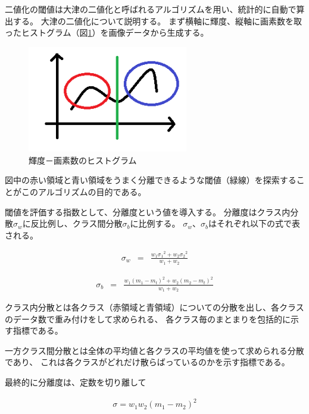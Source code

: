 \documentclass{jsarticle}
\begin{document}
\begin{multicols}{2}
二値化の閾値は大津の二値化と呼ばれるアルゴリズムを用い、統計的に自動で算出する。
大津の二値化について説明する。
まず横軸に輝度、縦軸に画素数を取ったヒストグラム（図\ref{fig:otsu}）を画像データから生成する。

\begin{figure}[H]
  \begin{center}
    \includegraphics[clip,width=7.0cm]{./img/otsu.png}
    \caption{輝度－画素数のヒストグラム}
    \label{fig:otsu}
  \end{center}
\end{figure}

図中の赤い領域と青い領域をうまく分離できるような閾値（緑線）を探索することがこのアルゴリズムの目的である。

閾値を評価する指数として、分離度という値を導入する。
分離度はクラス内分散$σ_{w}$に反比例し、クラス間分散$σ_{b}$に比例する。
$σ_{w}$、$σ_{b}$はそれぞれ以下の式で表される。

\begin{eqnarray}
\label{sigmaw}
{ \sigma  }_{ w } & = & \frac { { w }_{ 1 }{{ \sigma  }_{ 1 }}^{2}+{ w }_{ 2 }{{ \sigma  }_{ 2 } }^{2}}{ { w }_{ 1 }+{ w }_{ 2 } } 
\end{eqnarray}

\begin{eqnarray}
\label{sigmab}
{ \sigma  }_{ b } & = & \frac { { w }_{ 1 }{{ \left( { m }_{ 1 }-{ m }_{ t } \right)  }}^{2}+{ w }_{ 2 }{\left( { m }_{ 2 }-{ m }_{ t } \right)}^{2}  }{ { w }_{ 1 }+{ w }_{ 2 } } 
\end{eqnarray}

クラス内分散とは各クラス（赤領域と青領域）についての分散を出し、各クラスのデータ数で重み付けをして求められる、
各クラス毎のまとまりを包括的に示す指標である。

一方クラス間分散とは全体の平均値と各クラスの平均値を使って求められる分散であり、
これは各クラスがどれだけ散らばっているのかを示す指標である。

最終的に分離度は、定数を切り離して

\begin{eqnarray}
\label{eq:sigma}
\sigma = w_{1} w_{2}{\left(m_{1}-m_2 \right)}^{2}
\end{eqnarray}


\end{multicols}
\end{document}
